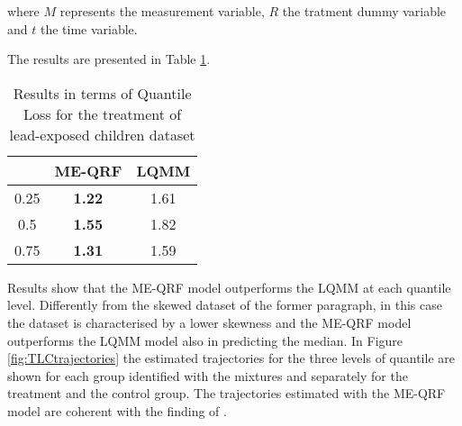 where $M$ represents the measurement variable, $R$ the tratment dummy variable and $t$ the time variable.

The results are presented in Table \ref{tab:child}.


\begin{table}[H]
\centering
\begin{tabular}{@{}ccc@{}}
\toprule
\cellcolor[HTML]{FFFFFF}{\color[HTML]{333333} $\tau$} & \multicolumn{1}{c}{\textbf{ME-QRF}} & \multicolumn{1}{c}{\textbf{LQMM}} \\ \midrule
0.25                                                  & \textbf{1.22}                            & 1.61                          \\
0.5                                                   & \textbf{1.55}                             & 1.82                           \\
0.75                                                  & \textbf{1.31}                            & 1.59                          \\ \bottomrule
\end{tabular}
\caption{Results in terms of Quantile Loss for the treatment of lead-exposed children dataset}
\label{tab:child}
\end{table}

Results show that the ME-QRF model outperforms the LQMM at each quantile level.
Differently from the skewed dataset of the former paragraph, in this case the dataset is characterised by a lower skewness and the ME-QRF model outperforms the LQMM model also in predicting the median.
In Figure \ref{fig:TLCtrajectories} the estimated trajectories for the three levels of quantile are shown for each group identified with the mixtures and separately for the treatment and the control group.
The trajectories estimated with the ME-QRF model are coherent with the finding of \cite{alfo2017finite}.
\newpage


